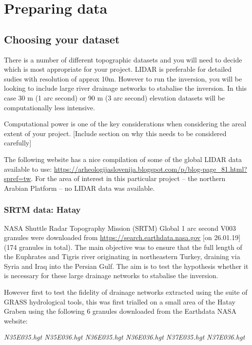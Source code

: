 \chapter{Preparing data} \label{prep}

\section{Choosing your dataset}

There is a number of different topographic datasets and you will need to decide which is most appropriate for your project. LIDAR is preferable for detailed sudies with resolution of approx 10m. However to run the inversion, you will be looking to include large river drainage networks to stabalise the inversion. In this case 30 m (1 arc second) or 90 m (3 arc second) elevation datasets will be computationally less intensive. 

Computational power is one of the key considerations when considering the areal extent of your project. [Include section on why this needs to be considered carefully]

The following website has a nice compilation of some of the global LIDAR data available to use: \url{https://arheologijaslovenija.blogspot.com/p/blog-page_81.html?spref=tw}. For the area of interest in this particular project – the northern Arabian Platform – no LIDAR data was available. 

\subsection{SRTM data: Hatay}

NASA Shuttle Radar Topography Mission (SRTM) Global 1 arc second V003 granules were downloaded from \url{https://search.earthdata.nasa.gov} [on 26.01.19] (174 granules in total). The main objective was to ensure that the full length of the Euphrates and Tigris river originating in northeastern Turkey, draining via Syria and Iraq into the Persian Gulf. The aim is to test the hypothesis whether it is necessary for these large drainage networks to stabalise the inversion. 

However first to test the fidelity of drainage networks extracted using the suite of GRASS hydrological tools, this was first trialled on a small area of the Hatay Graben using the following 6 granules downloaded from the Earthdata NASA website:

\textit{N35E035.hgt
N35E036.hgt
N36E035.hgt
N36E036.hgt
N37E035.hgt
N37E036.hgt}


